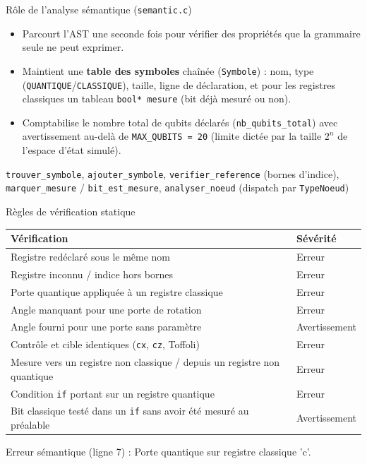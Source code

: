 \documentclass[10pt]{beamer}
\begin{document}
\begin{frame}{Rôle de l'analyse sémantique (\texttt{semantic.c})}
  \begin{itemize}
    \item Parcourt l'AST une seconde fois pour vérifier des propriétés que la grammaire seule ne peut exprimer.
    \item Maintient une \textbf{table des symboles} chaînée (\texttt{Symbole}) : nom, type (\texttt{QUANTIQUE}/\texttt{CLASSIQUE}), taille, ligne de déclaration, et pour les registres classiques un tableau \texttt{bool* mesure} (bit déjà mesuré ou non).
    \item Comptabilise le nombre total de qubits déclarés (\texttt{nb\_qubits\_total}) avec avertissement au-delà de \texttt{MAX\_QUBITS = 20} (limite dictée par la taille $2^n$ de l'espace d'état simulé).
  \end{itemize}
  \begin{keybox}[title=Fonctions clés]
    \small
    \texttt{trouver\_symbole}, \texttt{ajouter\_symbole}, \texttt{verifier\_reference} (bornes d'indice), \texttt{marquer\_mesure} / \texttt{bit\_est\_mesure}, \texttt{analyser\_noeud} (dispatch par \texttt{TypeNoeud})
  \end{keybox}
\end{frame}

\begin{frame}{Règles de vérification statique}
  \small
  \begin{tabular}{@{}p{6.3cm}p{5.3cm}@{}}
    \toprule
    \textbf{Vérification} & \textbf{Sévérité} \\
    \midrule
    Registre redéclaré sous le même nom & Erreur \\
    Registre inconnu / indice hors bornes & Erreur \\
    Porte quantique appliquée à un registre classique & Erreur \\
    Angle manquant pour une porte de rotation & Erreur \\
    Angle fourni pour une porte sans paramètre & Avertissement \\
    Contrôle et cible identiques (\texttt{cx}, \texttt{cz}, Toffoli) & Erreur \\
    Mesure vers un registre non classique / depuis un registre non quantique & Erreur \\
    Condition \texttt{if} portant sur un registre quantique & Erreur \\
    Bit classique testé dans un \texttt{if} sans avoir été mesuré au préalable & Avertissement \\
    \bottomrule
  \end{tabular}
  \vspace{6pt}
  \begin{warnbox}[title=Exemple de diagnostic]
    \ttfamily\scriptsize Erreur sémantique (ligne 7) : Porte quantique sur registre classique 'c'.
  \end{warnbox}
\end{frame}
\end{document}

